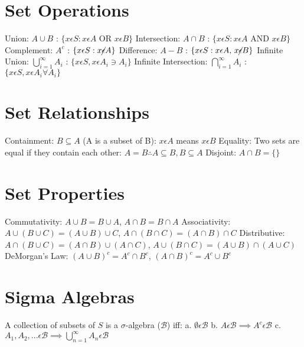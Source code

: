 \documentclass{article}
\begin{document}
\obeylines

\section*{Set Operations}

Union: $A \cup B$ : $\{x \epsilon S : x \epsilon A \text{ OR } x \epsilon B\}$
Intersection: $A \cap B$ : $\{x \epsilon S : x \epsilon A \text{ AND } x \epsilon B\}$
Complement: $A^c$ : $\{x \epsilon S : x \cancel{\epsilon} A\}$
Difference: $A - B$ : $\{x \epsilon S : x \epsilon A \text{, } x \cancel{\epsilon} B\}$
Infinite Union: $\bigcup\limits_{i=1}^{\infty} A_i$ : $\{x \epsilon S, x \epsilon A_i \ni A_i\}$
Infinite Intersection: $\bigcap\limits_{i=1}^{\infty} A_i$ : $\{x \epsilon S, x \epsilon A_i \forall A_i\}$

\section*{Set Relationships}
Containment: $ B \subseteq A$ (A is a subset of B): $x \epsilon A$ means $x \epsilon B$
Equality: Two sets are equal if they contain each other: $A = B \therefore A \subseteq B, B \subseteq A$
Disjoint: $ A \cap B = \{\}$

\section*{Set Properties}
Commutativity: $A \cup B = B \cup A$, $A \cap B = B \cap A$
Associativity: $A \cup (B \cup C) = (A \cup B) \cup C$, $A \cap (B \cap C) = (A \cap B) \cap C$
Distributive: $A \cap (B \cup C) = (A \cap B) \cup (A \cap C)$, $A \cup (B \cap C) = (A \cup B) \cap (A \cup C)$
DeMorgan's Law: $(A \cup B)^c = A^c \cap B^c$, $(A \cap B)^c = A^c \cup B^c$

\section*{Sigma Algebras}
A collection of subsets of $S$ is a $\sigma$-algebra ($\mathcal{B}$) iff: 
a. $\emptyset \epsilon \mathcal{B}$
b. $A \epsilon \mathcal{B} \implies A^c \epsilon \mathcal{B}$
c. $A_1, A_2, ... \epsilon \mathcal{B} \implies \bigcup\limits_{n=1}^{\infty} A_n \epsilon \mathcal{B}$
\end{document}
